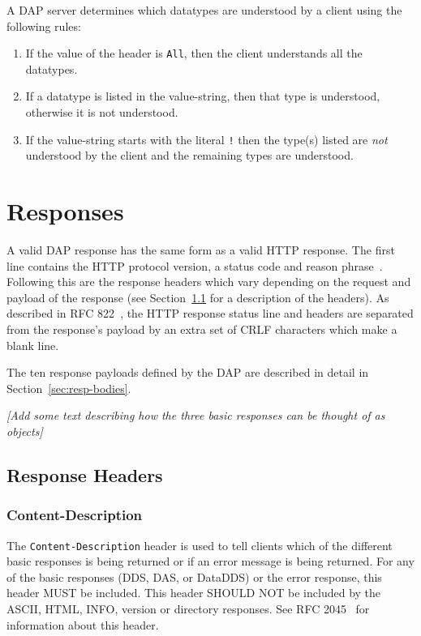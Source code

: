 \documentclass{article}
\begin{document}
A \ac{DAP} server determines which datatypes are understood by a client using
the following rules:
\begin{enumerate}
\item If the value of the header is \texttt{All}, then the client understands
  all the datatypes.
\item If a datatype is listed in the value-string, then that type is
  understood, otherwise it is not understood.
\item If the value-string starts with the literal \texttt{!} then the type(s)
  listed are \emph{not} understood by the client and the remaining types are
  understood. 
\end{enumerate}

\section{Responses}
\label{sec:responses}

A valid \ac{DAP} response has the same form as a valid \ac{HTTP} response.
The first line contains the \ac{HTTP} protocol version, a status code and
reason phrase~\cite{rfc2616}. Following this are the response headers which
vary depending on the request and payload of the response (see
Section~\ref{sec:resp-headers} for a description of the headers). As
described in RFC 822~\cite{rfc822}, the \ac{HTTP} response status line and
headers are separated from the response's payload by an extra set of CRLF
characters which make a blank line.

The ten response payloads defined by the \ac{DAP} are described in detail
in Section~\ref{sec:resp-bodies}. 

\emph{[Add some text describing how the three basic responses can be thought
  of as objects]}

\subsection{Response Headers}
\label{sec:resp-headers}

\subsubsection{Content-Description}
The \texttt{Content-Description} header is used to tell clients which of the
different basic responses is being returned or if an error message is being
returned. For any of the basic responses (\ac{DDS}, \ac{DAS}, or
\ac{DataDDS}) or the error response, this header MUST be included. This
header SHOULD NOT be included by the ASCII, HTML, INFO, version or directory
responses. See RFC 2045~\cite{rfc2045} for information about this header.
\end{document}
